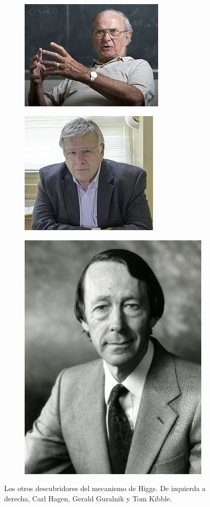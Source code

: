 \begin{figure}
\centering
\begin{subfigure}{0.31\textwidth}
	\includegraphics[scale=2]{images/hagen.jpg}
\end{subfigure}	
\begin{subfigure}{0.31\textwidth}
	\includegraphics[scale=0.5]{images/guralnik.jpg}
\end{subfigure}	
\begin{subfigure}{0.31\textwidth}
	\includegraphics[scale=0.25]{images/kibble.png}
\end{subfigure}	

	\caption{Los otros descubridores del mecanismo de Higgs.
        De izquierda a derecha, Carl Hagen, Gerald Guralnik y Tom Kibble.} 
\end{figure}

